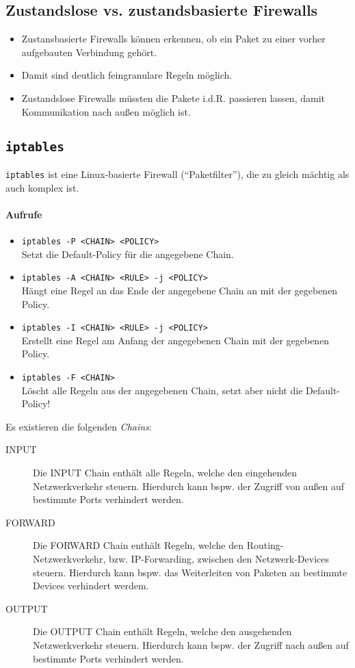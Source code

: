 		\subsection{Zustandslose vs. zustandsbasierte Firewalls}
			\begin{itemize}
				\item Zustansbasierte Firewalls können erkennen, ob ein Paket zu einer vorher aufgebauten Verbindung gehört.
				\item Damit sind deutlich feingranulare Regeln möglich.
				\item Zustandslose Firewalls müssten die Pakete i.d.R. passieren lassen, damit Kommunikation nach außen möglich ist.
			\end{itemize}

		\subsection{\texttt{iptables}}
			\texttt{iptables} ist eine Linux-basierte Firewall (\enquote{Paketfilter}), die zu gleich mächtig als auch komplex ist.

			\paragraph{Aufrufe}
				\begin{itemize}
					\item \texttt{iptables -P <CHAIN> <POLICY>} \\ Setzt die Default-Policy für die angegebene Chain.
					\item \texttt{iptables -A <CHAIN> <RULE> -j <POLICY>} \\ Hängt eine Regel an das Ende der angegebene Chain an mit der gegebenen Policy.
					\item \texttt{iptables -I <CHAIN> <RULE> -j <POLICY>} \\ Erstellt eine Regel am Anfang der angegebenen Chain mit der gegebenen Policy.
					\item \texttt{iptables -F <CHAIN>} \\ Löscht alle Regeln aus der angegebenen Chain, setzt aber nicht die Default-Policy!
				\end{itemize}

				Es existieren die folgenden \textit{Chains}:
				\begin{description}
					\item[INPUT]   Die INPUT Chain enthält alle Regeln, welche den eingehenden Netzwerkverkehr steuern. Hierdurch kann bspw. der Zugriff von außen auf bestimmte Ports verhindert werden.
					\item[FORWARD] Die FORWARD Chain enthält Regeln, welche den Routing-Netzwerkverkehr, bzw. IP-Forwarding, zwischen den Netzwerk-Devices steuern. Hierdurch kann bspw. das Weiterleiten von Paketen an bestimmte Devices verhindert werdem.
					\item[OUTPUT]  Die OUTPUT Chain enthält Regeln, welche den ausgehenden Netzwerkverkehr steuern. Hierdurch kann bspw. der Zugriff nach außen auf bestimmte Ports verhindert werden.
				\end{description}

